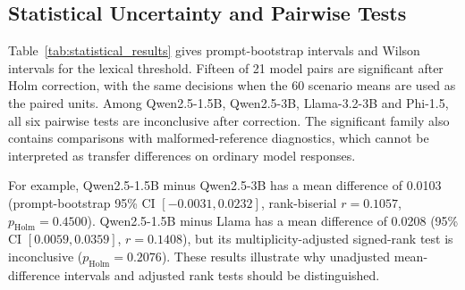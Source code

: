 \documentclass[electronics,article,submit,pdftex,moreauthors]{Definitions/mdpi}
\begin{document}
\begin{table}[ht]
\centering
\caption{EOS subsets of the archived-reference cohort ($N=300$ per model; validated length inputs, all segments, 80-token T5 input and output limits). EOS-only metrics select \texttt{response\_complete} samples; they do not certify correct reconstructions. Phi-3.5-mini and TinyLlama remain reference-format diagnostics.}
\label{tab:eos_completeness}
\end{table}

\subsection{Statistical Uncertainty and Pairwise Tests}
Table~\ref{tab:statistical_results} gives prompt-bootstrap intervals and Wilson intervals for the lexical threshold. Fifteen of 21 model pairs are significant after Holm correction, with the same decisions when the 60 scenario means are used as the paired units. Among Qwen2.5-1.5B, Qwen2.5-3B, Llama-3.2-3B and Phi-1.5, all six pairwise tests are inconclusive after correction. The significant family also contains comparisons with malformed-reference diagnostics, which cannot be interpreted as transfer differences on ordinary model responses.

For example, Qwen2.5-1.5B minus Qwen2.5-3B has a mean difference of 0.0103 (prompt-bootstrap 95\% CI $[-0.0031,0.0232]$, rank-biserial $r=0.1057$, $p_{\mathrm{Holm}}=0.4500$). Qwen2.5-1.5B minus Llama has a mean difference of 0.0208 (95\% CI $[0.0059,0.0359]$, $r=0.1408$), but its multiplicity-adjusted signed-rank test is inconclusive ($p_{\mathrm{Holm}}=0.2076$). These results illustrate why unadjusted mean-difference intervals and adjusted rank tests should be distinguished.
\end{document}
